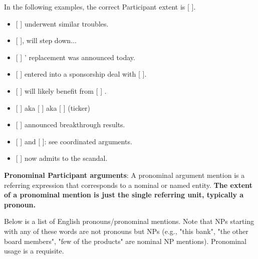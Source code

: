 In the following examples, the correct Participant extent is [  ].
\begin{itemize}[noitemsep]
    \item {[  ] underwent similar troubles.}
    \item {[  ], will step down...}
    \item {[  ] ' replacement was announced today.}
    \item {[  ] entered into a sponsorship deal with [  ].}
    \item {[  ] will likely benefit from [  ] .}
    \item {[  ] aka [  ] aka [  ] (ticker)}
    \item {[  ] announced breakthrough results.}
    \item {[  ] and [  ]: see coordinated arguments.}
    \item {[  ] now admits to the scandal.}
\end{itemize}

\noindent\textbf{Pronominal Participant arguments}:
A pronominal argument mention is a referring expression that corresponds to a nominal or named entity.
\textbf{The extent of a pronominal mention is just the single referring unit, typically a pronoun.}

Below is a list of English pronouns/pronominal mentions. 
Note that NPs starting with any of these words are not pronouns but NPs (e.g., "this bank", "the other board members", "few of the products" are nominal NP mentions).
Pronominal usage is a requisite.

